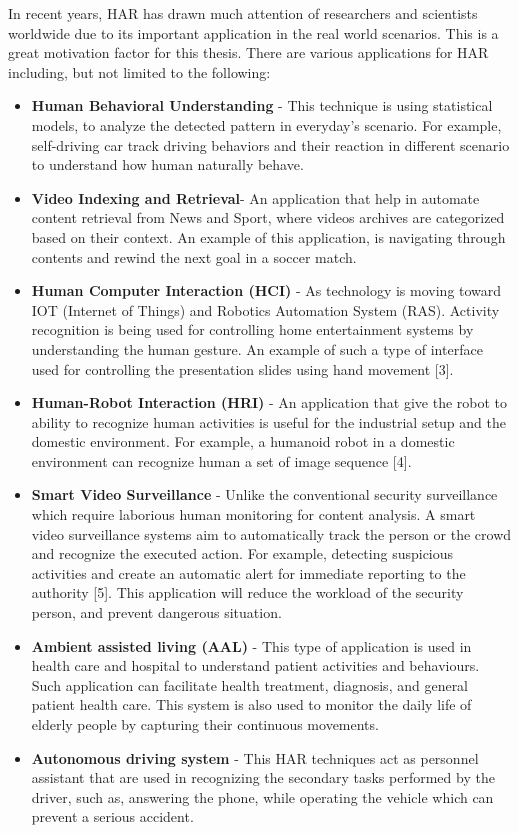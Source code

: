 In recent years, HAR has drawn much attention of researchers and scientists worldwide due to its important application in the real world scenarios. This is a great motivation factor for this thesis. There are various applications for HAR including, but not limited to the following:\\
\begin{itemize}
\item \textbf{Human Behavioral Understanding} - This technique is  using statistical models, to analyze the detected pattern in everyday's scenario. For example, self-driving car track driving behaviors and their reaction in different scenario to understand how human naturally behave.
\item \textbf{Video Indexing and Retrieval}- An application that help in automate content retrieval from News and Sport, where videos archives are categorized based on their context. An example of this application, is navigating through contents and rewind the next goal in a soccer match.
\item \textbf{Human Computer Interaction (HCI)} - As technology is moving toward IOT (Internet of Things) and Robotics Automation System (RAS). Activity recognition is being used for controlling home entertainment systems by understanding the human gesture. An example of such a type of interface used for controlling the presentation slides using hand movement [3].
\item \textbf{Human-Robot Interaction (HRI)} - An application that give the robot to ability to recognize human activities is useful for the industrial setup and the domestic environment. For example, a humanoid robot in a domestic environment can recognize human a set of image sequence [4]. 
\item \textbf{Smart Video Surveillance} - Unlike the conventional security surveillance which require laborious human monitoring for content analysis. A smart video surveillance systems aim to automatically track the person or the crowd and recognize the executed action. For example, detecting suspicious activities and create an automatic alert for immediate reporting to the authority [5]. This application will reduce the workload of the security person, and prevent dangerous situation.
\item \textbf{Ambient assisted living (AAL)} - This type of application is used in health care and hospital to understand patient activities and behaviours. Such application can facilitate health treatment, diagnosis, and general patient health care. This system is also used to monitor the daily life of elderly people by capturing their continuous movements.
\item \textbf{Autonomous driving system} - This HAR techniques act as personnel assistant that are used in recognizing the secondary tasks performed by the driver, such as, answering the phone, while operating the vehicle which can prevent a serious accident.  
\end{itemize}

